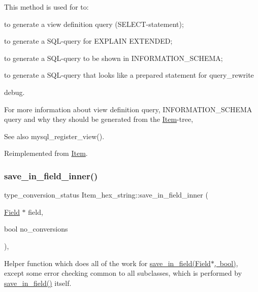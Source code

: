 This method is used for to\+:
\begin{DoxyItemize}
\item to generate a view definition query (S\+E\+L\+E\+CT-\/statement);
\item to generate a S\+QL-\/query for E\+X\+P\+L\+A\+IN E\+X\+T\+E\+N\+D\+ED;
\item to generate a S\+QL-\/query to be shown in I\+N\+F\+O\+R\+M\+A\+T\+I\+O\+N\+\_\+\+S\+C\+H\+E\+MA;
\item to generate a S\+QL-\/query that looks like a prepared statement for query\+\_\+rewrite
\item debug.
\end{DoxyItemize}

For more information about view definition query, I\+N\+F\+O\+R\+M\+A\+T\+I\+O\+N\+\_\+\+S\+C\+H\+E\+MA query and why they should be generated from the \mbox{\hyperlink{classItem}{Item}}-\/tree, \begin{DoxySeeAlso}{See also}
mysql\+\_\+register\+\_\+view(). 
\end{DoxySeeAlso}


Reimplemented from \mbox{\hyperlink{classItem_aa7ba4bde739d83adec8edf3bf1596d94}{Item}}.

\mbox{\label{classItem__hex__string_adb8f37241f406ed3c4aef366d462c219}} 
\subsubsection{\texorpdfstring{save\+\_\+in\+\_\+field\+\_\+inner()}{save\_in\_field\_inner()}}
{\footnotesize\ttfamily type\+\_\+conversion\+\_\+status Item\+\_\+hex\+\_\+string\+::save\+\_\+in\+\_\+field\+\_\+inner (\begin{DoxyParamCaption}\item[{\mbox{\hyperlink{classField}{Field}} $\ast$}]{field,  }\item[{bool}]{no\+\_\+conversions }\end{DoxyParamCaption})\hspace{0.3cm}{\ttfamily [protected]}, {\ttfamily [virtual]}}

Helper function which does all of the work for \mbox{\hyperlink{classItem_acf4c1888a07e9e0dd5787283c6569545}{save\+\_\+in\+\_\+field(\+Field$\ast$, bool)}}, except some error checking common to all subclasses, which is performed by \mbox{\hyperlink{classItem_acf4c1888a07e9e0dd5787283c6569545}{save\+\_\+in\+\_\+field()}} itself.


